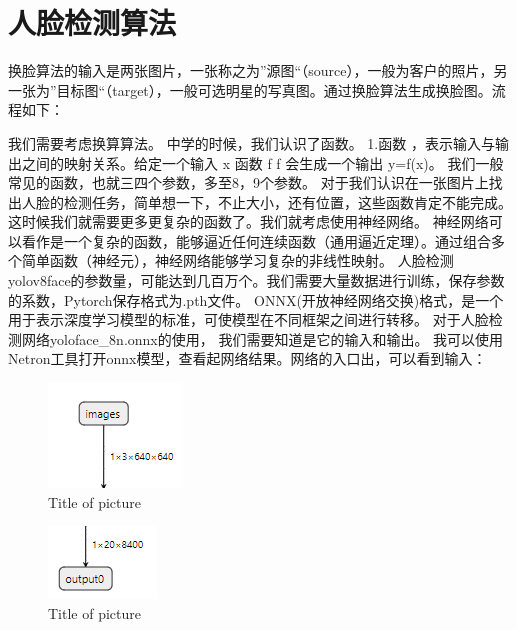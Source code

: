 \chapter{人脸检测算法}
换脸算法的输入是两张图片，一张称之为”源图“（source），一般为客户的照片，另一张为”目标图“（target），一般可选明星的写真图。通过换脸算法生成换脸图。流程如下：

我们需要考虑换算算法。
中学的时候，我们认识了函数。
1.函数 ，表示输入与输出之间的映射关系。给定一个输入 x 函数  f
f 会生成一个输出 y=f(x)。 我们一般常见的函数，也就三四个参数，多至8，9个参数。
对于我们认识在一张图片上找出人脸的检测任务，简单想一下，不止大小，还有位置，这些函数肯定不能完成。这时候我们就需要更多更复杂的函数了。我们就考虑使用神经网络。
神经网络可以看作是一个复杂的函数，能够逼近任何连续函数（通用逼近定理）。通过组合多个简单函数（神经元），神经网络能够学习复杂的非线性映射。
人脸检测yolov8face的参数量，可能达到几百万个。我们需要大量数据进行训练，保存参数的系数，Pytorch保存格式为.pth文件。
ONNX(开放神经网络交换)格式，是一个用于表示深度学习模型的标准，可使模型在不同框架之间进行转移。
对于人脸检测网络yoloface_8n.onnx的使用， 我们需要知道是它的输入和输出。
我可以使用Netron工具打开onnx模型，查看起网络结果。网络的入口出，可以看到输入：


\begin{figure}[H]
\centering
\includegraphics{figures/inputs.png}
\caption{Title of picture}
\end{figure}

\begin{figure}[H]
\centering
\includegraphics{figures/output.png}
\caption{Title of picture}
\end{figure}





